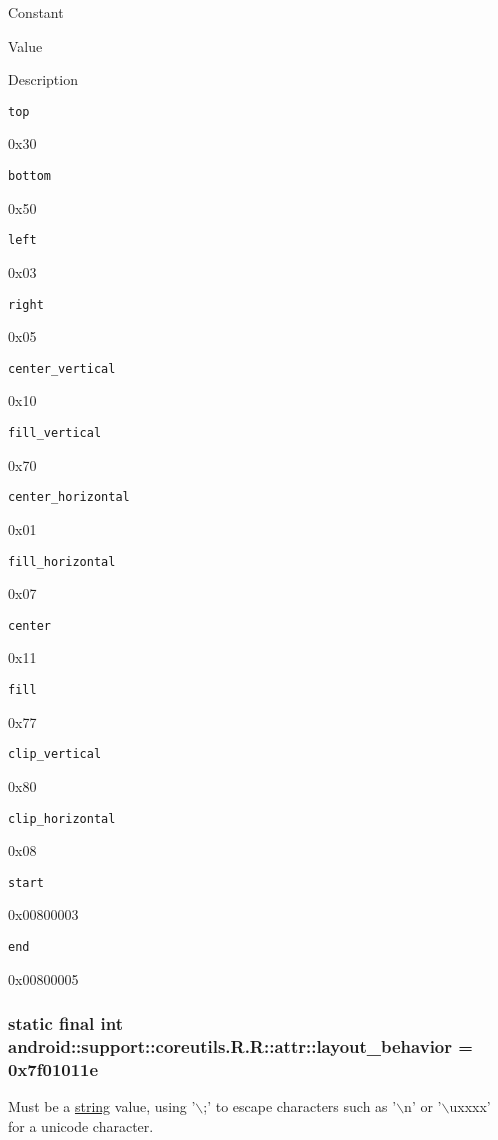 Constant

Value

Description 

{\tt top}

0x30

{\tt bottom}

0x50

{\tt left}

0x03

{\tt right}

0x05

{\tt center\_\-vertical}

0x10

{\tt fill\_\-vertical}

0x70

{\tt center\_\-horizontal}

0x01

{\tt fill\_\-horizontal}

0x07

{\tt center}

0x11

{\tt fill}

0x77

{\tt clip\_\-vertical}

0x80

{\tt clip\_\-horizontal}

0x08

{\tt start}

0x00800003

{\tt end}

0x00800005\hypertarget{classandroid_1_1support_1_1coreutils_1_1_r_1_1attr_85a9b8d9d5aa7ae5efc4b20c3fb96ccc}{
\subsubsection[{layout\_\-behavior}]{\setlength{\rightskip}{0pt plus 5cm}static final int android::support::coreutils.R.R::attr::layout\_\-behavior = 0x7f01011e}}
\label{classandroid_1_1support_1_1coreutils_1_1_r_1_1attr_85a9b8d9d5aa7ae5efc4b20c3fb96ccc}


Must be a \hyperlink{classandroid_1_1support_1_1coreutils_1_1_r_1_1string}{string} value, using '$\backslash$;' to escape characters such as '$\backslash$n' or '$\backslash$uxxxx' for a unicode character. 

